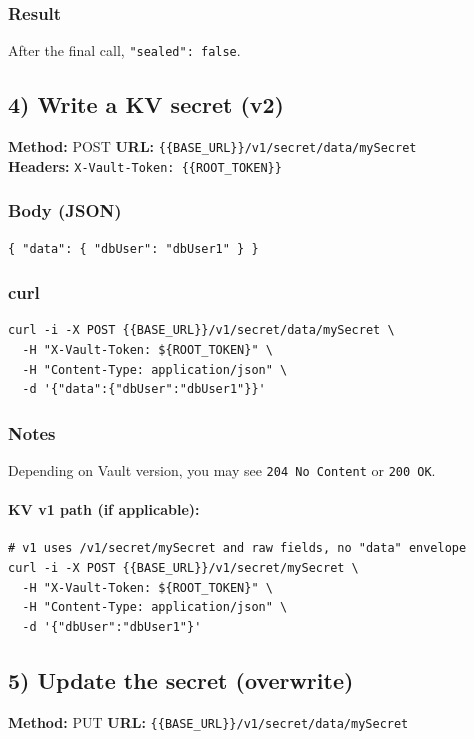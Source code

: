 \documentclass[11pt]{article}
\begin{document}
\subsubsection*{Result}
After the final call, \texttt{"sealed": false}.

\subsection{4) Write a KV secret (v2)}
\textbf{Method:} POST \quad \textbf{URL:} \texttt{\{\{BASE\_URL\}\}/v1/secret/data/mySecret} \\
\textbf{Headers:} \texttt{X-Vault-Token: \{\{ROOT\_TOKEN\}\}}

\subsubsection*{Body (JSON)}
\begin{verbatim}
{ "data": { "dbUser": "dbUser1" } }
\end{verbatim}

\subsubsection*{curl}
\begin{verbatim}
curl -i -X POST {{BASE_URL}}/v1/secret/data/mySecret \
  -H "X-Vault-Token: ${ROOT_TOKEN}" \
  -H "Content-Type: application/json" \
  -d '{"data":{"dbUser":"dbUser1"}}'
\end{verbatim}

\subsubsection*{Notes}
Depending on Vault version, you may see \texttt{204 No Content} or \texttt{200 OK}.

\paragraph{KV v1 path (if applicable):}
\begin{verbatim}
# v1 uses /v1/secret/mySecret and raw fields, no "data" envelope
curl -i -X POST {{BASE_URL}}/v1/secret/mySecret \
  -H "X-Vault-Token: ${ROOT_TOKEN}" \
  -H "Content-Type: application/json" \
  -d '{"dbUser":"dbUser1"}'
\end{verbatim}

\subsection{5) Update the secret (overwrite)}
\textbf{Method:} PUT \quad \textbf{URL:} \texttt{\{\{BASE\_URL\}\}/v1/secret/data/mySecret}
\end{document}
